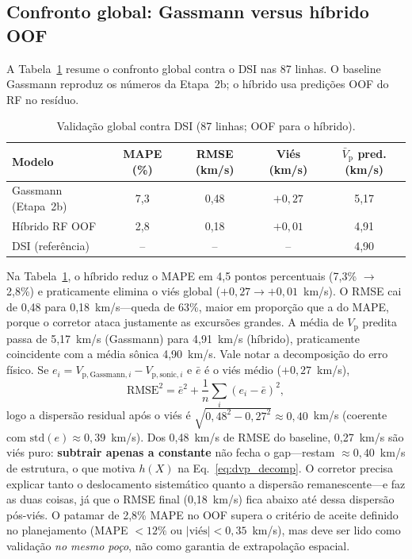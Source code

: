 \documentclass[11pt,a4paper]{article}
\numberwithin{equation}{section}
\newcommand{\Vp}{\ensuremath{V_{\mathrm{p}}}}
\begin{document}
\subsection{Confronto global: Gassmann versus híbrido OOF}
\label{sec:resultados_global}

A Tabela~\ref{tab:compare_global} resume o confronto global contra o DSI nas
87 linhas.
O baseline Gassmann reproduz os números da Etapa~2b; o híbrido usa
predições OOF do RF no resíduo.

\begin{table}[H]
  \centering
  \caption{Validação global contra DSI (87 linhas; OOF para o híbrido).}
  \label{tab:compare_global}
  \begin{tabular}{lcccc}
    \toprule
    Modelo & MAPE (\%) & RMSE (km/s) & Viés (km/s) & $\bar{V}_{\mathrm{p}}$ pred. (km/s) \\
    \midrule
    Gassmann (Etapa~2b) & 7,3 & 0,48 & $+0{,}27$ & 5,17 \\
    Híbrido RF OOF & 2,8 & 0,18 & $+0{,}01$ & 4,91 \\
    DSI (referência) & -- & -- & -- & 4,90 \\
    \bottomrule
  \end{tabular}
\end{table}

Na Tabela~\ref{tab:compare_global}, o híbrido reduz o MAPE em 4,5 pontos
percentuais (7,3\% $\rightarrow$ 2,8\%) e praticamente elimina o viés global
($+0{,}27 \rightarrow +0{,}01$~km/s).
O RMSE cai de 0,48 para 0,18~km/s---queda de 63\%, maior em proporção que a
do MAPE, porque o corretor ataca justamente as excursões grandes.
A média de \Vp{} predita passa de 5,17~km/s (Gassmann) para 4,91~km/s
(híbrido), praticamente coincidente com a média sônica 4,90~km/s.
Vale notar a decomposição do erro físico. Se
$e_i=V_{\mathrm{p,Gassmann},i}-V_{\mathrm{p,sonic},i}$ e
$\bar{e}$ é o viés médio ($+0{,}27$~km/s),
\begin{equation}
  \mathrm{RMSE}^{2}
  =
  \bar{e}^{2}
  +
  \frac{1}{n}\sum_i(e_i-\bar{e})^{2},
\end{equation}
logo a dispersão residual após o viés é
$\sqrt{0{,}48^{2}-0{,}27^{2}}\approx 0{,}40$~km/s
(coerente com $\mathrm{std}(e)\approx 0{,}39$~km/s).
Dos 0,48~km/s de RMSE do baseline, 0,27~km/s são viés puro:
\textbf{subtrair apenas a constante} não fecha o gap---restam
$\approx 0{,}40$~km/s de estrutura, o que motiva $h(X)$ na
Eq.~\eqref{eq:dvp_decomp}.
O corretor precisa explicar tanto o deslocamento sistemático quanto a
dispersão remanescente---e faz as duas coisas, já que o RMSE final
(0,18~km/s) fica abaixo até dessa dispersão pós-viés.
O patamar de 2,8\% MAPE no OOF supera o critério de aceite definido
no planejamento (MAPE $< 12\%$ ou $|\text{viés}| < 0{,}35$~km/s), mas deve
ser lido como validação \emph{no mesmo poço}, não como garantia de
extrapolação espacial.
\end{document}
